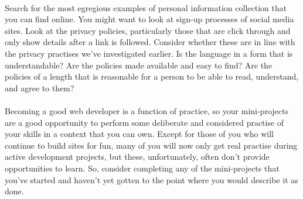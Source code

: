\documentclass[10pt, a4paper, twosize]{article}
\begin{document}
\paragraph{} Search for the most egregious examples of personal information collection that you can find online. You might want to look at sign-up processes of social media sites. Look at the privacy policies, particularly those that are click through and only show details after a link is followed. Consider whether these are in line with the privacy practises we've investigated earlier. Is the language in a form that is understandable? Are the policies made available and easy to find? Are the policies of a length that is reasonable for a person to be able to read, understand, and agree to them?

\paragraph{} Becoming a good web developer is a function of practice, so your mini-projects are a good opportunity to perform some deliberate and considered practise of your skills in a context that you can own. Except for those of you who will continue to build sites for fun, many of you will now only get real practise during active development projects, but these, unfortunately, often don't provide opportunities to learn. So, consider completing any of the mini-projects that you've started and haven't yet gotten to the point where you would describe it as done.
\end{document}
